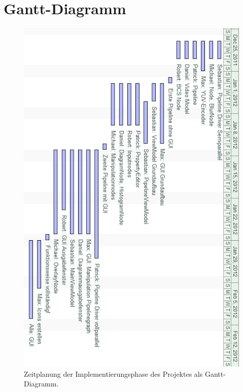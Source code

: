 \section{Gantt-Diagramm}

\begin{figure}[h!]
\begin{center}
\includegraphics[height=0.7\textheight]{Diagrams/ganttchart.png}
\end{center}
\caption{Zeitplanung der Implementierungsphase des Projektes als Gantt-Diagramm.}
\end{figure}
